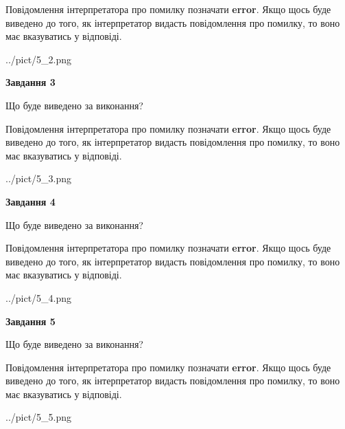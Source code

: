 \documentclass[12pt, ukrainian]{article}
\begin{document}
{\begin {large}
Повідомлення інтерпретатора про помилку позначати \textbf{error}.
Якщо щось буде виведено до того, як інтерпретатор видасть повідомлення про помилку, 
то воно має вказуватись у відповіді. \par


\begin{center}
	{../pict/5_2.png}
\end{center}
\newpage

{\begin {center}\textbf{Завдання 3}\end {center}}\par
Що буде виведено за виконання?

Повідомлення інтерпретатора про помилку позначати \textbf{error}.
Якщо щось буде виведено до того, як інтерпретатор видасть повідомлення про помилку, 
то воно має вказуватись у відповіді. \par


\begin{center}
	{../pict/5_3.png}
\end{center}
\newpage

{\begin {center}\textbf{Завдання 4}\end {center}}\par
Що буде виведено за виконання?

Повідомлення інтерпретатора про помилку позначати \textbf{error}.
Якщо щось буде виведено до того, як інтерпретатор видасть повідомлення про помилку, 
то воно має вказуватись у відповіді. \par


\begin{center}
	{../pict/5_4.png}
\end{center}
\newpage

{\begin {center}\textbf{Завдання 5}\end {center}}\par
Що буде виведено за виконання?

Повідомлення інтерпретатора про помилку позначати \textbf{error}.
Якщо щось буде виведено до того, як інтерпретатор видасть повідомлення про помилку, 
то воно має вказуватись у відповіді. \par


\begin{center}
	{../pict/5_5.png}
\end{center}
\newpage


\end{large}}
\end{document}
